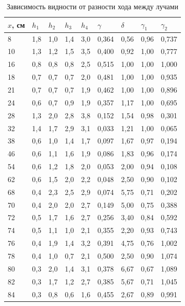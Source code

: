\documentclass[a4paper,12pt]{article} %
\begin{document}
		\begin{table}[H]
			\caption{Зависимость видности от разности хода между лучами}
			\label{table:exp2}
			\begin{tabular}{|l|l|l|l|l|l|l|l|l|}
				\hline
				$x$, см & $h_1$  & $h_2$  & $h_3$  & $h_4$ & $ \gamma $    & $ \delta $   & $ \gamma_1 $   & $ \gamma_2 $    \\ \hline
				8      & 1,8 & 1,0   & 1,4 & 3,0   & 0,364 & 0,56 & 0,96 & 0,737 \\ \hline
				10     & 1,3 & 1,2 & 1,5 & 3,5 & 0,400 & 0,92 & 1,00 & 0,777 \\ \hline
				16     & 0,8 & 0,8 & 0,8 & 2,5 & 0,515 & 1,00 & 1,00 & 1,000 \\ \hline
				18     & 0,7 & 0,7 & 0,7 & 2,0   & 0,481 & 1,00 & 1,00 & 0,935 \\ \hline
				21     & 0,7 & 0,7 & 0,7 & 1,9 & 0,462 & 1,00 & 1,00 & 0,896 \\ \hline
				24     & 0,6 & 0,7 & 0,9 & 1,9 & 0,357 & 1,17 & 1,00 & 0,695 \\ \hline
				28     & 1,3 & 2,0   & 2,8 & 3,8 & 0,152 & 1,54 & 0,98 & 0,301 \\ \hline
				32     & 1,4 & 1,7 & 2,9 & 3,1 & 0,033 & 1,21 & 1,00 & 0,065 \\ \hline
				38     & 0,6 & 1,0   & 1,4 & 1,7 & 0,097 & 1,67 & 0,97 & 0,194 \\ \hline
				46     & 0,6 & 1,1 & 1,6 & 1,9 & 0,086 & 1,83 & 0,96 & 0,174 \\ \hline
				54     & 0,6 & 1,2 & 1,8 & 2,0   & 0,053 & 2,00 & 0,94 & 0,108 \\ \hline
				62     & 0,6 & 1,5 & 2,0   & 2,2 & 0,048 & 2,50 & 0,90 & 0,102 \\ \hline
				68     & 0,4 & 2,3 & 2,5 & 2,9 & 0,074 & 5,75 & 0,71 & 0,202 \\ \hline
				70     & 0,4 & 2,0   & 2,0   & 2,7 & 0,149 & 5,00 & 0,75 & 0,388 \\ \hline
				72     & 0,5 & 1,7 & 1,6 & 2,7 & 0,256 & 3,40 & 0,84 & 0,592 \\ \hline
				74     & 0,5 & 1,1 & 1,0   & 2,1 & 0,355 & 2,20 & 0,93 & 0,743 \\ \hline
				76     & 0,4 & 1,9 & 1,4 & 3,2 & 0,391 & 4,75 & 0,76 & 1,002 \\ \hline
				78     & 0,4 & 1,0   & 0,7 & 2,1 & 0,500 & 2,50 & 0,90 & 1,074 \\ \hline
				80     & 0,3 & 2,0  & 1,4 & 3,1 & 0,378 & 6,67 & 0,67 & 1,089 \\ \hline
				82     & 0,3 & 1,7 & 1,2 & 2,7 & 0,385 & 5,67 & 0,71 & 1,045 \\ \hline
				84     & 0,3 & 0,8 & 0,6 & 1,6 & 0,455 & 2,67 & 0,89 & 0,991 \\ \hline
			\end{tabular}
		\end{table}
	\newpage
\end{document}
